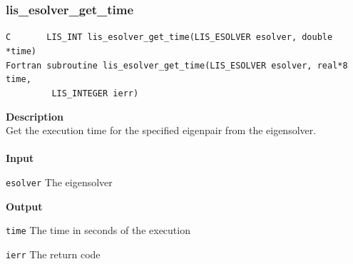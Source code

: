 \documentclass[a4paper]{article}
\newcommand{\namelistlabel}[1]{\mbox{#1}\hfill}
\newenvironment{namelist}[1]{%
\begin{list}{}
  {\let\makelabel\namelistlabel
  \settowidth{\labelwidth}{#1}
  \setlength{\leftmargin}{1.1\labelwidth}}
  }{%
\end{list}}
\begin{document}
\subsubsection{lis\_esolver\_get\_time}
\begin{screen}
\verb|C       LIS_INT lis_esolver_get_time(LIS_ESOLVER esolver, double *time)|\\
\verb|Fortran subroutine lis_esolver_get_time(LIS_ESOLVER esolver, real*8 time,|\\
\verb|         LIS_INTEGER ierr)|
\end{screen}
{\bf Description}\\
\indent
Get the execution time for the specified eigenpair from the eigensolver.
\\ \\
\noindent
{\bf Input}
\begin{namelist}{XXXXXXXXXXXXXXXXXXXX}
\item[\tt esolver] The eigensolver
\end{namelist}
{\bf Output}
\begin{namelist}{XXXXXXXXXXXXXXXXXXXX}
\item[\tt time] The time in seconds of the execution
\item[\tt ierr] The return code
\end{namelist}

\newpage
\end{document}
